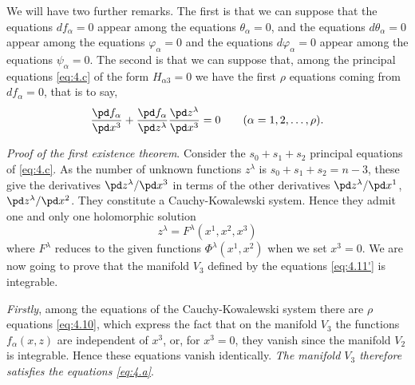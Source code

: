 We will have two further remarks. The first is that we can suppose that the equations $df_{\alpha}=0$ appear among the equations $\theta_{\alpha}=0$, and the equations $d\theta_{\alpha}=0$ appear among the equations $\varphi_{\alpha}=0$ and the equations $d\varphi_{\alpha}=0$ appear among the equations $\psi_{\alpha}=0$. The second is that we can suppose that, among the principal equations \eqref{eq:4.c} of the form $H_{\alpha 3}=0$ we have the first $\rho$  equations coming from $df_{\alpha}=0$, that is to say,
\begin{equation}
  \label{eq:4.10}
  \frac{\pd f_{\alpha}}{\pd x^{3}}+\frac{\pd f_{\alpha}}{\pd z^{\lambda}}\frac{\pd z^{\lambda}}{\pd x^{3}}=0\qquad (\alpha=1,2,\dots,\rho).
\end{equation}


\vspace{12pt}\fsec \emph{Proof of the first existence theorem}. Consider the $s_{0}+s_{1}+s_{2}$ principal equations of \eqref{eq:4.c}. As the number of unknown functions $z^{\lambda}$ is $s_{0}+s_{1}+s_{2}=n-3$, these give the derivatives $\pd z^{\lambda}/\pd x^{3}$ in terms of the other derivatives $\pd z^{\lambda}/\pd x^{1}$, $\pd z^{\lambda}/\pd x^{2}$. They constitute a Cauchy-Kowalewski system. Hence they admit one and only one holomorphic solution
\begin{equation}
  \label{eq:4.11'}
  z^{\lambda}=F^{\lambda}(x^{1},x^{2},x^{3})
\end{equation}
where $F^{\lambda}$ reduces to the given functions $\Phi^{\lambda}(x^{1},x^{2})$ when we set $x^{3}=0$. We are now going to prove that the manifold $V_{3}$ defined by the equations \eqref{eq:4.11'} is integrable.

\emph{Firstly}, among the equations of the Cauchy-Kowalewski system there are $\rho$ equations \eqref{eq:4.10}, which express the fact that on the manifold $V_{3}$ the functions $f_{\alpha}(x,z)$ are independent of $x^{3}$, or, for $x^{3}=0$, they vanish since the manifold $V_{2}$ is integrable. Hence these equations vanish identically. \emph{The manifold $V_{3}$ therefore satisfies the equations \eqref{eq:4.a}}.

